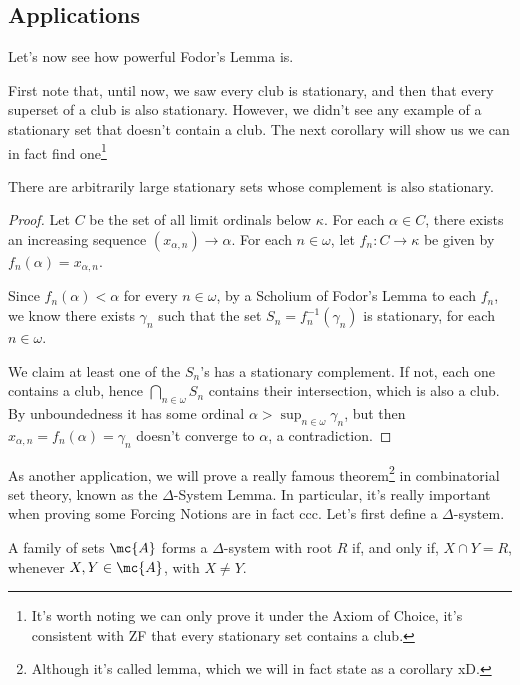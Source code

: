\subsection{Applications}

Let's now see how powerful Fodor's Lemma is.

First note that, until now, we saw every club is stationary, and then that every superset of a club is also stationary. However, we didn't see any example of a stationary set that doesn't contain a club. The next corollary will show us we can in fact find one\footnote{It's worth noting we can only prove it under the Axiom of Choice, it's consistent with ZF that every stationary set contains a club.}

\begin{corollary}{}{}
    There are arbitrarily large stationary sets whose complement is also stationary.
\end{corollary}

\begin{proof}
    Let $C$ be the set of all limit ordinals below $\kappa$. For each $\alpha\in C$, there exists an increasing sequence $(x_{\alpha,n})\to \alpha$. For each $n\in\omega$, let $f_n:C\to\kappa$ be given by $f_n(\alpha)=x_{\alpha,n}$.

    Since $f_n(\alpha)<\alpha$ for every $n\in\omega$, by a Scholium of Fodor's Lemma to each $f_n$, we know there exists $\gamma_n$ such that the set $S_n=f^{-1}_n(\gamma_n)$ is stationary, for each $n\in\omega$.

    We claim at least one of the $S_n$'s has a stationary complement. If not, each one contains a club, hence $\bigcap_{n\in\omega}S_n$ contains their intersection, which is also a club. By unboundedness it has some ordinal $\alpha>\sup_{n\in\omega}\gamma_n$, but then $x_{\alpha,n}=f_n(\alpha)=\gamma_n$ doesn't converge to $\alpha$, a contradiction.
\end{proof}

As another application, we will prove a really famous theorem\footnote{Although it's called lemma, which we will in fact state as a corollary xD.} in combinatorial set theory, known as the $\Delta$-System Lemma. In particular, it's really important when proving some Forcing Notions are in fact ccc. Let's first define a $\Delta$-system.

\begin{definition}{}{}
    A family of sets $\mc{A}$ forms a $\Delta$-system with root $R$ if, and only if, $X\cap Y=R$, whenever $X,Y\in\mc{A}$, with $X\neq Y$.
\end{definition}

